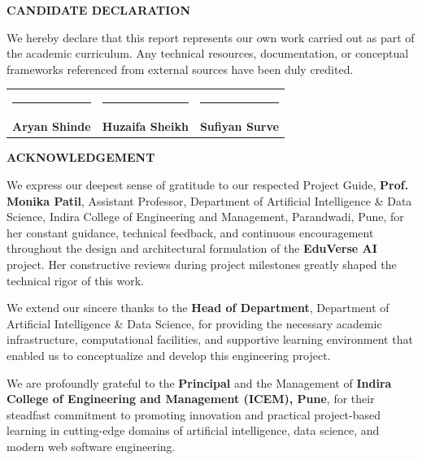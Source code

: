 \documentclass[11pt,a4paper]{report}
\begin{document}
\vspace{0.8cm}
\begin{center}
    \textbf{\color{icemNavy}CANDIDATE DECLARATION}
\end{center}
\vspace{-0.2cm}
We hereby declare that this report represents our own work carried out as part of the academic curriculum. Any technical resources, documentation, or conceptual frameworks referenced from external sources have been duly credited.

\vspace{0.6cm}
\noindent
\begin{tabular*}{\textwidth}{@{\extracolsep{\fill}}ccc}
    \rule{4.5cm}{0.4pt} & \rule{4.5cm}{0.4pt} & \rule{4.5cm}{0.4pt} \\
    \textbf{Aryan Shinde} & \textbf{Huzaifa Sheikh} & \textbf{Sufiyan Surve}
\end{tabular*}
\clearpage

\thispagestyle{plain}
\begin{center}
    {\Large\bfseries\color{icemNavy} ACKNOWLEDGEMENT}
\end{center}
\vspace{0.4cm}

We express our deepest sense of gratitude to our respected Project Guide, \textbf{Prof. Monika Patil}, Assistant Professor, Department of Artificial Intelligence \& Data Science, Indira College of Engineering and Management, Parandwadi, Pune, for her constant guidance, technical feedback, and continuous encouragement throughout the design and architectural formulation of the \textbf{EduVerse AI} project. Her constructive reviews during project milestones greatly shaped the technical rigor of this work.

We extend our sincere thanks to the \textbf{Head of Department}, Department of Artificial Intelligence \& Data Science, for providing the necessary academic infrastructure, computational facilities, and supportive learning environment that enabled us to conceptualize and develop this engineering project.

We are profoundly grateful to the \textbf{Principal} and the Management of \textbf{Indira College of Engineering and Management (ICEM), Pune}, for their steadfast commitment to promoting innovation and practical project-based learning in cutting-edge domains of artificial intelligence, data science, and modern web software engineering.
\end{document}
